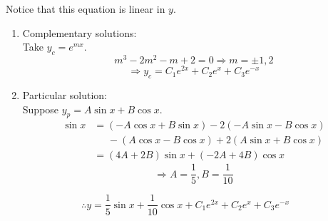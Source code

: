 \item

Notice that this equation is linear in $y$.
\begin{enumerate}[wide, labelindent = 0pt, label = (\roman*)]
	\item Complementary solutions:\\
	Take $y_c = e^{mx}$.
	\[
		m^3 - 2m^2 - m + 2 = 0
		\Rightarrow m = \pm 1, 2
	\]
	\[
		\Rightarrow y_c = C_1 e^{2x} + C_2 e^x + C_3 e^{-x}
	\]

	\item Particular solution:\\
	Suppose $y_p = A\sin x + B\cos x$.
	\begin{align*}
		\sin x
		&= (-A\cos x + B\sin x) - 2(-A\sin x - B\cos x) \\
		&\;\;\;\;\;- (A\cos x - B\cos x) + 2(A\sin x + B\cos x) \\
		&= (4A + 2B)\sin x + (-2A + 4B)\cos x
	\end{align*}
	\[
		\Rightarrow A = \frac{1}{5}, B = \frac{1}{10}
	\]
\end{enumerate}
\[
	\therefore y = \frac{1}{5}\sin x + \frac{1}{10}\cos x + C_1 e^{2x} + C_2 e^x + C_3 e^{-x}
\]